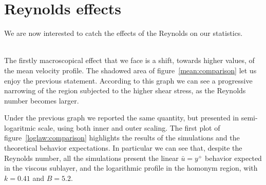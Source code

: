 \section{Reynolds effects}
We are now interested to catch the effects of the Reynolds on our statistics.\\~\par
The firstly macroscopical effect that we face is a shift, towards higher values, of the mean velocity profile. The shadowed area of figure~\ref{mean:comparison} let us enjoy the previous statement. According to this graph we can see a progressive narrowing of the region subjected to the higher shear stress, as the Reynolds number becomes larger.\par
Under the previous graph we reported the same quantity, but presented in semi-logaritmic scale, using both inner and outer scaling.
The first plot of figure~\ref{loglaw:comparison} highlights the results of the simulations and the theoretical behavior expectations.
In particular we can see that, despite the Reynolds number, all the simulations present the linear $\bar{u}=y^{+}$ behavior expected in the viscous sublayer, and the logarithmic profile in the homonym region, with $k=0.41$ and $B=5.2$.\\~\par

